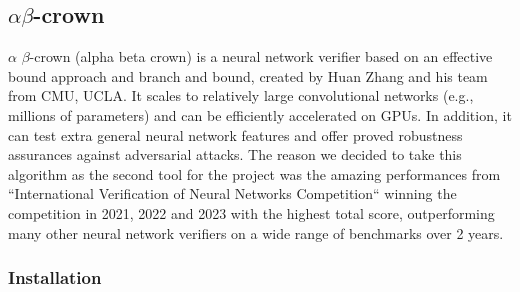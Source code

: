\documentclass[12pt]{report}
\begin{document}
\subsection{$\alpha$$\beta$-crown} 

$\alpha$ $\beta$-crown (alpha beta crown) is a neural network verifier based on an effective bound approach and branch and bound, created by Huan Zhang and his team from CMU, UCLA. It scales to relatively large convolutional networks (e.g., millions of parameters) and can be efficiently accelerated on GPUs. In addition, it can test extra general neural network features and offer proved robustness assurances against adversarial attacks. The reason we decided to take this algorithm as the second tool for the project was the amazing performances from ``International Verification of Neural Networks Competition`` winning the competition in 2021, 2022 and 2023 with the highest total score, outperforming many other neural network verifiers on a wide range of benchmarks over 2 years.

\subsubsection{Installation}

\printbibliography
\end{document}
